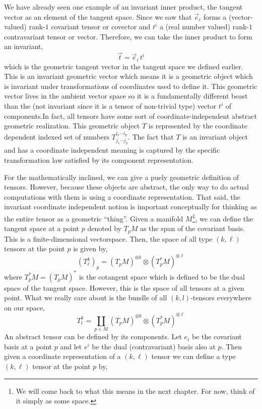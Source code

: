 \documentclass[11pt, a4paper]{article}
\begin{document}
We have already seen one example of an invariant inner product, the tangent vector as an element of the tangent space. Since we saw that $\vec{e}_i$ forms a (vector-valued) rank-$1$ covariant tensor or covector and $t^i$ a (real number valued) rank-$1$ contravariant tensor or vector. Therefore, we can take the inner product to form an invariant,
\[ \vec{t} = \vec{e}_i \, t^i \] 
which is the geometric tangent vector in the tangent space we defined earlier. This is an invariant geometric vector which means it is a geometric object which is invariant under transformations of coordinates used to define it. This geometric vector lives in the ambient vector space so it is a fundamentally different beast than the (not invariant since it is a tensor of non-trivial type) vector $t^i$ of components.In fact, all tensors have some sort of coordinate-independent abstract geometric realization. This geometric object $T$ is represented by the coordinate dependent indexed set of numbers $T^{i_1 \cdots i_p}_{j_1 \cdots j_q}$. The fact that $T$ is an invariant object and has a coordinate independent meaning is captured by the specific transformation law satisfied by its component representation. 
\par
For the mathematically inclined, we can give a puely geometric definition of tensors. However, because these objects are abstract, the only way to do actual computations with them is using a coordinate representation. That said, the invariant coordinate independent notion is important conceptually for thinking as the entire tensor as a geometric ``thing''. Given a manifold $M$\footnote{We will come back to what this means in the next chapter. For now, think of it simply as some space.}, we can define the tangent space at a point $p$ denoted by $T_p M$ as the span of the covariant basis. This is a finite-dimensional vectorspace. Then, the space of all type $(k, \ell)$ tensors at the point $p$ is given by,
\[ (T^k_\ell)_p = (T_p M)^{\otimes k} \otimes (T^*_p M)^{\otimes \ell}\]
where $T_p^* M = (T_p M)^*$ is the cotangent space which is defined to be the dual space of the tangent space. However, this is the space of all tensors at a given point. What we really care about is the bundle of all $(k,l)$-tensors everywhere on our space,
\[T^k_l = \coprod_{p \in M} (T_p M)^{\otimes k} \otimes (T^*_p M)^{\otimes \ell}\]
An abstract tensor can be defined by its components. Let $e_i$ be the covariant basis at a point $p$ and let $e^i$ be the dual (contravariant) basis also at $p$. Then given a coordinate representation of a $(k, \ell)$ tensor we can define a type $(k, \ell)$ tensor at the point $p$ by,
\end{document}
